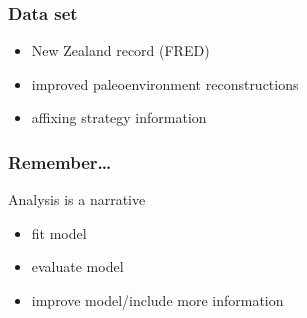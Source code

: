 \documentclass{beamer}
\begin{document}
\begin{frame}
  \frametitle{Data set} %
  \begin{itemize}
    \item New Zealand record (FRED)
    \item improved paleoenvironment reconstructions
    \item affixing strategy information
  \end{itemize}
\end{frame}

\begin{frame}
  \frametitle{Remember\dots}
  Analysis is a narrative

  \bigskip

  \begin{itemize}
    \item fit model
    \item evaluate model
    \item improve model/include more information
  \end{itemize}
\end{frame}
\end{document}
